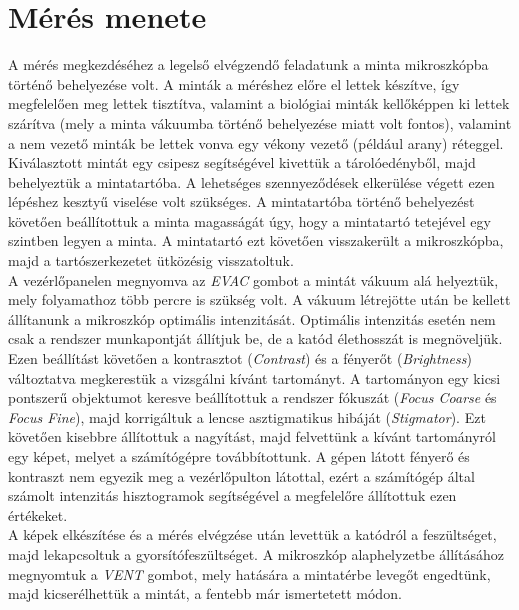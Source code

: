 \documentclass[12pt,a4paper]{article}
\begin{document}
\section{Mérés menete}
\hspace*{10pt} A mérés megkezdéséhez a legelső elvégzendő feladatunk a minta mikroszkópba történő behelyezése volt. A minták a méréshez előre el lettek készítve, így megfelelően meg lettek tisztítva, valamint a biológiai minták kellőképpen ki lettek szárítva (mely a minta vákuumba történő behelyezése miatt volt fontos), valamint a nem vezető minták be lettek vonva egy vékony vezető (például arany) réteggel. Kiválasztott mintát egy csipesz segítségével kivettük a tárolóedényből, majd behelyeztük a mintatartóba. A lehetséges szennyeződések elkerülése végett ezen lépéshez kesztyű viselése volt szükséges. A mintatartóba történő behelyezést követően beállítottuk a minta magasságát úgy, hogy a mintatartó tetejével egy szintben legyen a minta. A mintatartó ezt követően visszakerült a mikroszkópba, majd a tartószerkezetet ütközésig visszatoltuk.\\
\hspace*{10pt}  A vezérlőpanelen megnyomva az \emph{EVAC} gombot a mintát vákuum alá helyeztük, mely folyamathoz több percre is szükség volt. A vákuum létrejötte után be kellett állítanunk  a mikroszkóp optimális intenzitását. Optimális intenzitás esetén nem csak a rendszer munkapontját állítjuk be, de a katód élethosszát is megnöveljük. Ezen beállítást követően a kontrasztot (\emph{Contrast}) és a fényerőt (\emph{Brightness}) változtatva megkerestük a vizsgálni kívánt tartományt. A tartományon egy kicsi pontszerű objektumot keresve beállítottuk a rendszer fókuszát (\emph{Focus Coarse} és \emph{Focus Fine}), majd korrigáltuk a lencse asztigmatikus hibáját (\emph{Stigmator}). Ezt követően kisebbre állítottuk a nagyítást, majd felvettünk a kívánt tartományról egy képet, melyet a számítógépre továbbítottunk. A gépen látott fényerő és kontraszt nem egyezik meg a vezérlőpulton látottal, ezért a számítógép által számolt intenzitás hisztogramok segítségével a megfelelőre állítottuk ezen értékeket.\\
\hspace*{10pt} A képek elkészítése és a mérés elvégzése után levettük a katódról a feszültséget, majd lekapcsoltuk a gyorsítófeszültséget. A mikroszkóp alaphelyzetbe állításához megnyomtuk a \emph{VENT} gombot, mely hatására a mintatérbe levegőt engedtünk, majd kicserélhettük a mintát, a fentebb már ismertetett módon.
\end{document}
